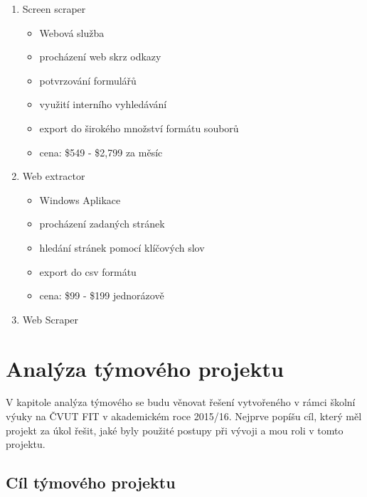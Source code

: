 \documentclass[thesis=B,czech]{FITthesis}[2012/06/26]
\begin{document}
\begin{enumerate}
\item Screen scraper \cite{ScreenScraper}

  \begin{itemize}
    \item Webová služba
    \item procházení web skrz odkazy
    \item potvrzování formulářů
    \item využití interního vyhledávání
    \item export do širokého množství formátu souborů
    \item cena: \$549 - \$2,799 za měsíc
  \end{itemize}
  
\item Web extractor \cite{WebExtractor}

  \begin{itemize}
    \item Windows Aplikace
    \item procházení zadaných stránek
    \item hledání stránek pomocí klíčových slov
    \item export do csv formátu
    \item cena: \$99 - \$199 jednorázově
  \end{itemize}

\item Web Scraper \cite{WebScraper}

\end{enumerate}

\newpage

\chapter{Analýza týmového projektu}
V kapitole analýza týmového se budu věnovat řešení vytvořeného v rámci školní výuky na ČVUT FIT v akademickém roce 2015/16.
Nejprve popíšu cíl, který měl projekt za úkol řešit, jaké byly použité postupy při vývoji a mou roli v tomto projektu.

\section{Cíl týmového projektu}
\end{document}
